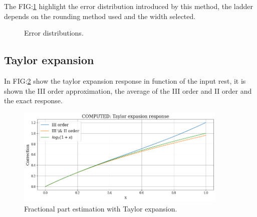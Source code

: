 \documentclass[12pt]{article}
\begin{document}
The FIG:\ref{fig:LUT_Error} highlight the error distribution introduced by this method, the ladder depends on the rounding method used and the width selected.
\begin{figure}[h]
    \begin{minipage}[c]{0.5\linewidth}
        \vspace{0pt}
        \centering
    \end{minipage}%
    \hfill%
    \begin{minipage}[c]{0.5\linewidth}
        \vspace{0pt}
        \centering
    \end{minipage}%
    \caption{Error distributions.}
    \label{fig:LUT_Error}
\end{figure}


\newpage

\subsection{Taylor expansion}

In FIG:\ref{fig:TE_resp} show the taylor expansion response in function of the input rest, it is shown the III order approximation, the average of the III order and II order and the exact response.
\begin{figure}[h]
    \includegraphics[width=0.9\textwidth]{Images/TE_respnse.png}
    \caption{Fractional part estimation with Taylor expansion.}
    \label{fig:TE_resp}
\end{figure}
\end{document}
